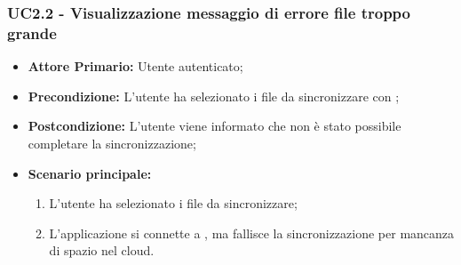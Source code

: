 \subsubsection{UC2.2 - Visualizzazione messaggio di errore file troppo grande}
\label{UC2.2}
\begin{itemize}
\item \textbf{Attore Primario:} Utente autenticato;
\item \textbf{Precondizione:} L'utente ha selezionato i file da sincronizzare con ;
\item \textbf{Postcondizione:} L'utente viene informato che non è stato possibile completare la sincronizzazione;
\item \textbf{Scenario principale:}
    \begin{enumerate}
    \item L'utente ha selezionato i file da sincronizzare;
    \item L'applicazione si connette a , ma fallisce la sincronizzazione per mancanza di spazio nel cloud.
    \end{enumerate}
\end{itemize}